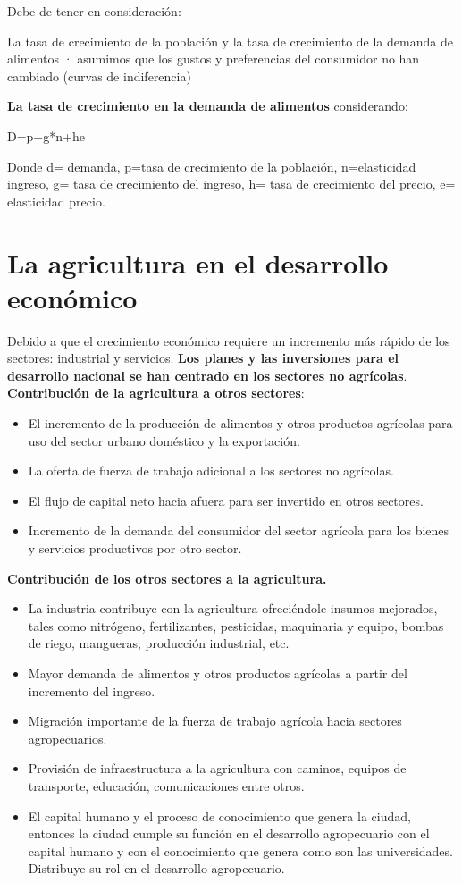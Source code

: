 \documentclass[
  letterpaper,
  DIV=11,
  numbers=noendperiod]{scrartcl}
\begin{document}
Debe de tener en consideración:

La tasa de crecimiento de la población y la tasa de crecimiento de la
demanda de alimentos · asumimos que los gustos y preferencias del
consumidor no han cambiado (curvas de indiferencia)

\textbf{La tasa de crecimiento en la demanda de alimentos} considerando:

D=p+g*n+he

Donde d= demanda, p=tasa de crecimiento de la población, n=elasticidad
ingreso, g= tasa de crecimiento del ingreso, h= tasa de crecimiento del
precio, e= elasticidad precio.

\hypertarget{la-agricultura-en-el-desarrollo-econuxf3mico}{%
\section{La agricultura en el desarrollo
económico}\label{la-agricultura-en-el-desarrollo-econuxf3mico}}

Debido a que el crecimiento económico requiere un incremento más rápido
de los sectores: industrial y servicios. \textbf{Los planes y las
inversiones para el desarrollo nacional se han centrado en los sectores
no agrícolas}. \textbf{Contribución de la agricultura a otros sectores}:

\begin{itemize}
\item
  El incremento de la producción de alimentos y otros productos
  agrícolas para uso del sector urbano doméstico y la exportación.
\item
  La oferta de fuerza de trabajo adicional a los sectores no agrícolas.
\item
  El flujo de capital neto hacia afuera para ser invertido en otros
  sectores.
\item
  Incremento de la demanda del consumidor del sector agrícola para los
  bienes y servicios productivos por otro sector.
\end{itemize}

\textbf{Contribución de los otros sectores a la agricultura.}

\begin{itemize}
\item
  La industria contribuye con la agricultura ofreciéndole insumos
  mejorados, tales como nitrógeno, fertilizantes, pesticidas, maquinaria
  y equipo, bombas de riego, mangueras, producción industrial, etc.
\item
  Mayor demanda de alimentos y otros productos agrícolas a partir del
  incremento del ingreso.
\item
  Migración importante de la fuerza de trabajo agrícola hacia sectores
  agropecuarios.
\item
  Provisión de infraestructura a la agricultura con caminos, equipos de
  transporte, educación, comunicaciones entre otros.
\item
  El capital humano y el proceso de conocimiento que genera la ciudad,
  entonces la ciudad cumple su función en el desarrollo agropecuario con
  el capital humano y con el conocimiento que genera como son las
  universidades. Distribuye su rol en el desarrollo agropecuario.
\end{itemize}
\end{document}
